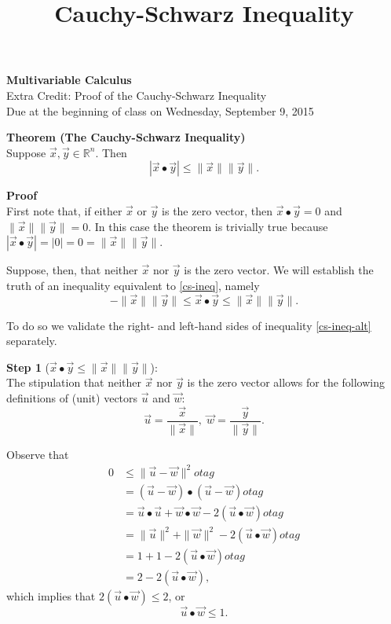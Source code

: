 \documentclass[11pt]{article}
\begin{document}
\title{Cauchy-Schwarz Inequality}

\thispagestyle{empty}

\begin{center}
{\LARGE \bf Multivariable Calculus}\\
{\large Extra Credit: Proof of the Cauchy-Schwarz Inequality}\\
Due at the beginning of class on Wednesday, September 9, 2015
\end{center}

\textbf{Theorem (The Cauchy-Schwarz Inequality)}\\
Suppose $\vec{x},\vec{y} \in \mathbb{R}^n$. Then 
\begin{equation}
|\vec{x} \bullet \vec{y}| \le \|\vec{x}\| \|\vec{y}\| \label{cs-ineq}.
\end{equation}

\textbf{Proof}\\
First note that, if either $\vec{x}$ or $\vec{y}$ is the zero vector, 
then $\vec{x} \bullet \vec{y} = 0$ and $\|\vec{x}\| \|\vec{y}\| = 0$. 
In this case the theorem is trivially true because 
$|\vec{x} \bullet \vec{y}| = |0| = 0 = \|\vec{x}\| \|\vec{y}\|$.

Suppose, then, that neither $\vec{x}$ nor $\vec{y}$ is the zero vector. 
We will establish the truth of an inequality equivalent to \eqref{cs-ineq}, 
namely
\begin{equation}
-\|\vec{x}\| \|\vec{y}\| \le \vec{x} \bullet \vec{y} \le 
\|\vec{x}\| \|\vec{y}\|. \label{cs-ineq-alt}
\end{equation}
  
To do so we validate the right- and left-hand sides of inequality 
\eqref{cs-ineq-alt} separately.

\textbf{Step 1} ($\vec{x} \bullet \vec{y} \le \|\vec{x}\| \|\vec{y}\|$):\\
The stipulation that neither $\vec{x}$ nor $\vec{y}$ is the zero vector 
allows for the following definitions of (unit) vectors $\vec{u}$ and $\vec{w}$:
\begin{equation}
\vec{u} = \frac{\vec{x}}{\|\vec{x}\|}, \; \vec{w} = 
\frac{\vec{y}}{\|\vec{y}\|}. \label{def1}
\end{equation}

Observe that
\begin{align}
0 & \le \|\vec{u}-\vec{w}\|^2 
otag\\
  & =(\vec{u}-\vec{w}) \bullet (\vec{u}-\vec{w}) 
otag\\
  & = \vec{u} \bullet \vec{u} + \vec{w} \bullet \vec{w} - 2(\vec{u}\bullet\vec{w}) 
otag\\
  & = \|\vec{u}\|^2 + \|\vec{w}\|^2 - 2(\vec{u} \bullet \vec{w}) 
otag\\
  & = 1 + 1 - 2(\vec{u} \bullet \vec{w}) 
otag\\
  & = 2 - 2(\vec{u} \bullet \vec{w}) \label{eq1},
\end{align}
which implies that $2(\vec{u} \bullet \vec{w}) \le 2$, or
\begin{equation}
  \vec{u} \bullet \vec{w} \le 1. \label{final}
\end{equation}
\end{document}
